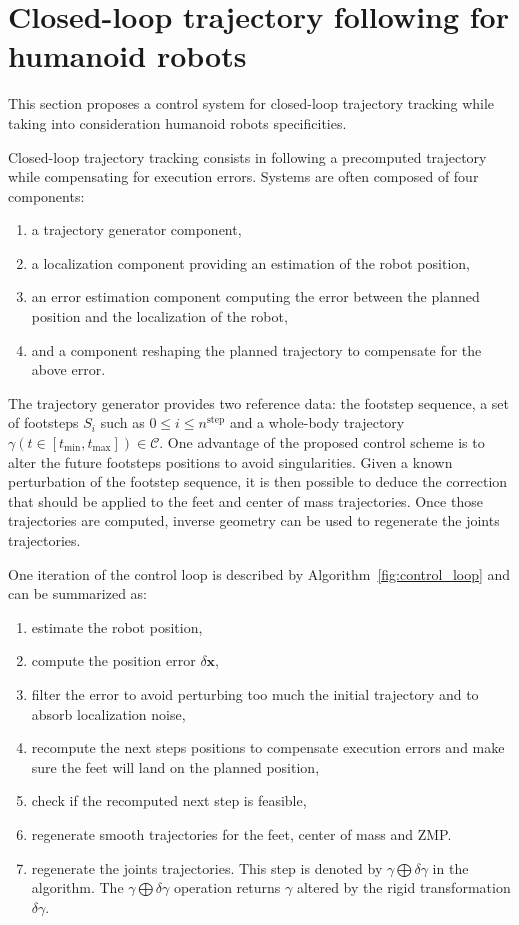 \section{Closed-loop trajectory following for humanoid robots}
\label{closedloop}


This section proposes a control system for closed-loop trajectory
tracking while taking into consideration humanoid robots
specificities.


Closed-loop trajectory tracking consists in following a precomputed
trajectory while compensating for execution errors. Systems are often
composed of four components:
\begin{enumerate}
\item a trajectory generator component,
\item a localization component providing an estimation of the robot
  position,
\item an error estimation component computing the error between the
  planned position and the localization of the robot,
\item and a component reshaping the planned trajectory to compensate
  for the above error.
\end{enumerate}


The trajectory generator provides two reference data: the footstep
sequence, a set of footsteps $S_i$ such as \mbox{$0 \leq i \leq
  n^{\text{step}}$} and a whole-body trajectory \mbox{$\gamma(t \in
  [t_{\text{min}}, t_{\text{max}}]) \in \mathcal{C}$}. One advantage
of the proposed control scheme is to alter the future footsteps
positions to avoid singularities. Given a known perturbation of the
footstep sequence, it is then possible to deduce the correction that
should be applied to the feet and center of mass trajectories. Once
those trajectories are computed, inverse geometry can be used to
regenerate the joints trajectories.


One iteration of the control loop is described by
Algorithm~\ref{fig:control_loop} and can be summarized as:
\begin{enumerate}
\item estimate the robot position,
\item compute the position error \mbox{$\delta \mathbf{x}$},
\item filter the error to avoid perturbing too much the initial
  trajectory and to absorb localization noise,
\item recompute the next steps positions to compensate execution
  errors and make sure the feet will land on the planned position,
\item check if the recomputed next step is feasible,
\item regenerate smooth trajectories for the feet, center of mass and
  ZMP.
\item regenerate the joints trajectories. This step is denoted by
  \mbox{$\gamma \bigoplus \delta \gamma$} in the algorithm. The
  \mbox{$\gamma \bigoplus \delta \gamma$} operation returns $\gamma$
  altered by the rigid transformation \mbox{$\delta \gamma$}.
\end{enumerate}


